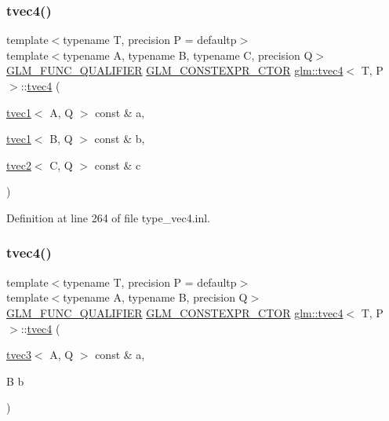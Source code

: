 \subsubsection{\texorpdfstring{tvec4()}{tvec4()}\hspace{0.1cm}{\footnotesize\ttfamily [29/35]}}
{\footnotesize\ttfamily template$<$typename T, precision P = defaultp$>$ \\
template$<$typename A, typename B, typename C, precision Q$>$ \\
\mbox{\hyperlink{setup_8hpp_a33fdea6f91c5f834105f7415e2a64407}{G\+L\+M\+\_\+\+F\+U\+N\+C\+\_\+\+Q\+U\+A\+L\+I\+F\+I\+ER}} \mbox{\hyperlink{setup_8hpp_ad34178a09666081abdb573c14d1f4a5a}{G\+L\+M\+\_\+\+C\+O\+N\+S\+T\+E\+X\+P\+R\+\_\+\+C\+T\+OR}} \mbox{\hyperlink{structglm_1_1tvec4}{glm\+::tvec4}}$<$ T, P $>$\+::\mbox{\hyperlink{structglm_1_1tvec4}{tvec4}} (\begin{DoxyParamCaption}\item[{\mbox{\hyperlink{structglm_1_1tvec1}{tvec1}}$<$ A, Q $>$ const \&}]{a,  }\item[{\mbox{\hyperlink{structglm_1_1tvec1}{tvec1}}$<$ B, Q $>$ const \&}]{b,  }\item[{\mbox{\hyperlink{structglm_1_1tvec2}{tvec2}}$<$ C, Q $>$ const \&}]{c }\end{DoxyParamCaption})}



Definition at line 264 of file type\+\_\+vec4.\+inl.

\mbox{\label{structglm_1_1tvec4_a001bfb02e9fa17b80e0623427fa0930a}} 
\subsubsection{\texorpdfstring{tvec4()}{tvec4()}\hspace{0.1cm}{\footnotesize\ttfamily [30/35]}}
{\footnotesize\ttfamily template$<$typename T, precision P = defaultp$>$ \\
template$<$typename A, typename B, precision Q$>$ \\
\mbox{\hyperlink{setup_8hpp_a33fdea6f91c5f834105f7415e2a64407}{G\+L\+M\+\_\+\+F\+U\+N\+C\+\_\+\+Q\+U\+A\+L\+I\+F\+I\+ER}} \mbox{\hyperlink{setup_8hpp_ad34178a09666081abdb573c14d1f4a5a}{G\+L\+M\+\_\+\+C\+O\+N\+S\+T\+E\+X\+P\+R\+\_\+\+C\+T\+OR}} \mbox{\hyperlink{structglm_1_1tvec4}{glm\+::tvec4}}$<$ T, P $>$\+::\mbox{\hyperlink{structglm_1_1tvec4}{tvec4}} (\begin{DoxyParamCaption}\item[{\mbox{\hyperlink{structglm_1_1tvec3}{tvec3}}$<$ A, Q $>$ const \&}]{a,  }\item[{B}]{b }\end{DoxyParamCaption})}




